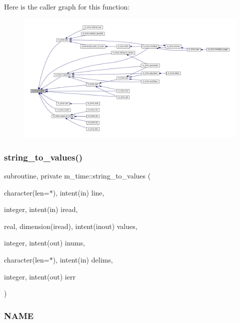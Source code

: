 Here is the caller graph for this function\+:\nopagebreak
\begin{figure}[H]
\begin{center}
\leavevmode
\includegraphics[width=350pt]{namespacem__time_ac729ead2b5aa4c756d52284cd7d22bf2_icgraph}
\end{center}
\end{figure}
\mbox{\label{namespacem__time_aa6ebf9f13e386a27257b5d207fcd3eec}} 
\subsubsection{\texorpdfstring{string\+\_\+to\+\_\+values()}{string\_to\_values()}}
{\footnotesize\ttfamily subroutine, private m\+\_\+time\+::string\+\_\+to\+\_\+values (\begin{DoxyParamCaption}\item[{character(len=$\ast$), intent(in)}]{line,  }\item[{integer, intent(in)}]{iread,  }\item[{real, dimension(iread), intent(inout)}]{values,  }\item[{integer, intent(out)}]{inums,  }\item[{character(len=$\ast$), intent(in)}]{delims,  }\item[{integer, intent(out)}]{ierr }\end{DoxyParamCaption})\hspace{0.3cm}{\ttfamily [private]}}



\subsubsection*{N\+A\+ME}

